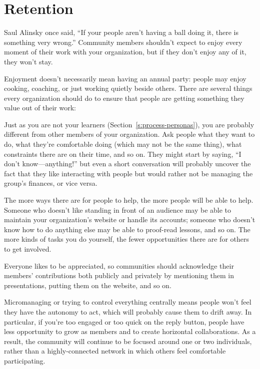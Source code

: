 \section{Retention}\label{s:community-retention}

Saul Alinsky once said, ``If your people aren't having a ball doing it,
there is something very wrong.'' \cite{Alin1989} Community members
shouldn't expect to enjoy every moment of their work with your
organization, but if they don't enjoy any of it, they won't stay.

Enjoyment doesn't necessarily mean having an annual party: people may
enjoy cooking, coaching, or just working quietly beside others. There
are several things every organization should do to ensure that people
are getting something they value out of their work:

\begin{description}
\tightlist
\item[Ask people what they want rather than guessing.]
Just as you are not your learners (Section~\ref{s:process-personas}),
you are probably different from other members of your organization.
Ask people what they want to do, what they're comfortable doing
(which may not be the same thing), what constraints there are on
their time, and so on. They might start by saying, ``I don't
know---anything!'' but even a short conversation will probably
uncover the fact that they like interacting with people but would
rather not be managing the group's finances, or vice versa.
\item[Provide many ways to contribute.]
The more ways there are for people to help, the more people will be
able to help. Someone who doesn't like standing in front of an
audience may be able to maintain your organization's website or
handle its accounts; someone who doesn't know how to do anything
else may be able to proof-read lessons, and so on. The more kinds of
tasks you do yourself, the fewer opportunities there are for others
to get involved.
\item[Recognize contributions.]
Everyone likes to be appreciated, so communities should acknowledge
their members' contributions both publicly and privately by
mentioning them in presentations, putting them on the website, and
so on.
\item[Make space.]
Micromanaging or trying to control everything centrally means people
won't feel they have the autonomy to act, which will probably cause
them to drift away. In particular, if you're too engaged or too
quick on the reply button, people have less opportunity to grow as
members and to create horizontal collaborations. As a result, the
community will continue to be focused around one or two individuals,
rather than a highly-connected network in which others feel
comfortable participating.
\end{description}

